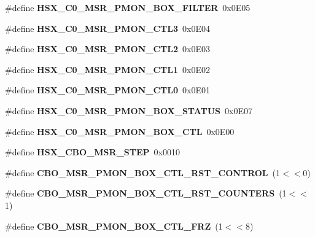 \begin{DoxyCompactItemize}
\item 
\#define {\bfseries H\+S\+X\+\_\+\+C0\+\_\+\+M\+S\+R\+\_\+\+P\+M\+O\+N\+\_\+\+B\+O\+X\+\_\+\+F\+I\+L\+T\+E\+R}~0x0\+E05\label{types_8h_afb645148c0bc53f930c261beb89d8917}

\item 
\#define {\bfseries H\+S\+X\+\_\+\+C0\+\_\+\+M\+S\+R\+\_\+\+P\+M\+O\+N\+\_\+\+C\+T\+L3}~0x0\+E04\label{types_8h_a0e187286b4065a99c163b16148ec55c8}

\item 
\#define {\bfseries H\+S\+X\+\_\+\+C0\+\_\+\+M\+S\+R\+\_\+\+P\+M\+O\+N\+\_\+\+C\+T\+L2}~0x0\+E03\label{types_8h_a04832897a121e2f5b41ca838167f1292}

\item 
\#define {\bfseries H\+S\+X\+\_\+\+C0\+\_\+\+M\+S\+R\+\_\+\+P\+M\+O\+N\+\_\+\+C\+T\+L1}~0x0\+E02\label{types_8h_a3b5551679911d1aeae997f8ef7301cb9}

\item 
\#define {\bfseries H\+S\+X\+\_\+\+C0\+\_\+\+M\+S\+R\+\_\+\+P\+M\+O\+N\+\_\+\+C\+T\+L0}~0x0\+E01\label{types_8h_aefe839c3f8f7ed7cbc015af9d8f33d6d}

\item 
\#define {\bfseries H\+S\+X\+\_\+\+C0\+\_\+\+M\+S\+R\+\_\+\+P\+M\+O\+N\+\_\+\+B\+O\+X\+\_\+\+S\+T\+A\+T\+U\+S}~0x0\+E07\label{types_8h_a54d94edec0a19b29a4141921474a6c5b}

\item 
\#define {\bfseries H\+S\+X\+\_\+\+C0\+\_\+\+M\+S\+R\+\_\+\+P\+M\+O\+N\+\_\+\+B\+O\+X\+\_\+\+C\+T\+L}~0x0\+E00\label{types_8h_a7b086658ef1778f2fac70fb80674b5b2}

\item 
\#define {\bfseries H\+S\+X\+\_\+\+C\+B\+O\+\_\+\+M\+S\+R\+\_\+\+S\+T\+E\+P}~0x0010\label{types_8h_a826c879043248aeec6a0b910fd0d161c}

\item 
\#define {\bfseries C\+B\+O\+\_\+\+M\+S\+R\+\_\+\+P\+M\+O\+N\+\_\+\+B\+O\+X\+\_\+\+C\+T\+L\+\_\+\+R\+S\+T\+\_\+\+C\+O\+N\+T\+R\+O\+L}~(1$<$$<$0)\label{types_8h_a0a3f5d0205144cf52a67d70d25bc98d3}

\item 
\#define {\bfseries C\+B\+O\+\_\+\+M\+S\+R\+\_\+\+P\+M\+O\+N\+\_\+\+B\+O\+X\+\_\+\+C\+T\+L\+\_\+\+R\+S\+T\+\_\+\+C\+O\+U\+N\+T\+E\+R\+S}~(1$<$$<$1)\label{types_8h_ab533675ad73fcb4947fdf64249ce6cc2}

\item 
\#define {\bfseries C\+B\+O\+\_\+\+M\+S\+R\+\_\+\+P\+M\+O\+N\+\_\+\+B\+O\+X\+\_\+\+C\+T\+L\+\_\+\+F\+R\+Z}~(1$<$$<$8)\label{types_8h_a386b435e56d92d7415cbf86ffe23bb77}


\end{DoxyCompactItemize}
